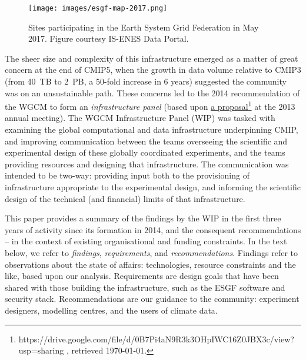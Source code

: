 \documentclass[gmd,manuscript]{copernicus}
\begin{document}
\begin{figure*}
  \begin{center}
    \texttt{[image: images/esgf-map-2017.png]}
  \end{center}
  \caption{Sites participating in the Earth System Grid Federation in
    May 2017. Figure courtesy IS-ENES Data Portal. }
  \label{fig:esgf}
\end{figure*}

The sheer size and complexity of this infrastructure emerged as a
matter of great concern at the end of CMIP5, when the growth in data
volume relative to CMIP3 (from 40~TB to 2~PB, a 50-fold increase in 6
years) suggested the community was on an unsustainable path. These
concerns led to the 2014 recommendation of the WGCM to form an
\emph{infrastructure panel} (based upon
\href{https://drive.google.com/file/d/0B7Pi4aN9R3k3OHpIWC16Z0JBX3c/view?usp=sharing
}{a
  proposal}\footnote{https://drive.google.com/file/d/0B7Pi4aN9R3k3OHpIWC16Z0JBX3c/view?usp=sharing
  , retrieved \today.} at the 2013 annual meeting). The WGCM
Infrastructure Panel (WIP) was tasked with examining the global
computational and data infrastructure underpinning CMIP, and improving
communication between the teams overseeing the scientific and
experimental design of these globally coordinated experiments, and the
teams providing resources and designing that infrastructure. The
communication was intended to be two-way: providing input both to the
provisioning of infrastructure appropriate to the experimental design,
and informing the scientific design of the technical (and financial)
limits of that infrastructure.

This paper provides a summary of the findings by the WIP in the first
three years of activity since its formation in 2014, and the
consequent recommendations -- in the context of existing
organisational and funding constraints. In the text below, we refer to
\emph{findings}, \emph{requirements}, and \emph{recommendations}.
Findings refer to observations about the state of affairs:
technologies, resource constraints and the like, based upon our
analysis. Requirements are design goals that have been shared with
those building the infrastructure, such as the ESGF software and
security stack. Recommendations are our guidance to the community:
experiment designers, modelling centres, and the users of climate
data.
\end{document}
